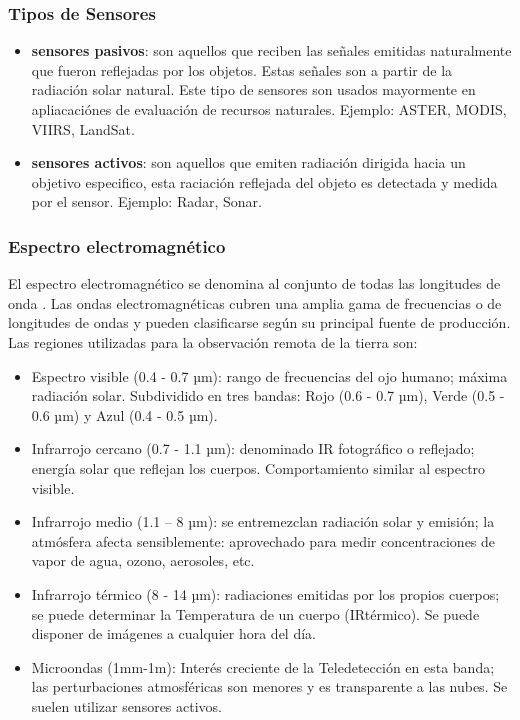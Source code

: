 \subsubsection{Tipos de Sensores}
\begin{itemize}
\item \textbf{sensores pasivos}: son aquellos que reciben las señales emitidas naturalmente que fueron reflejadas por los objetos. Estas señales son a partir de la radiación solar natural. Este tipo de sensores son  usados mayormente en apliacaciónes de evaluación de recursos naturales. Ejemplo: ASTER, MODIS, VIIRS, LandSat.

\item \textbf{sensores activos}: son aquellos que emiten radiación dirigida hacia un objetivo especifico, esta raciación reflejada del objeto es detectada y medida por el sensor. Ejemplo: Radar, Sonar.
\end{itemize}

\subsubsection{Espectro electromagnético}

El espectro electromagnético se denomina al conjunto de todas las longitudes de onda \citep{chuvieco}. Las ondas electromagnéticas cubren una amplia gama de frecuencias o de longitudes de ondas y pueden clasificarse según su principal fuente de producción. 
Las regiones utilizadas para la observación remota de la tierra son:
\begin{itemize}
\item Espectro visible (0.4 - 0.7 µm): rango de frecuencias del ojo humano; máxima radiación solar. Subdividido en tres bandas: Rojo (0.6 - 0.7 µm), Verde (0.5 - 0.6 µm) y Azul (0.4 - 0.5 µm).

\item Infrarrojo cercano (0.7 - 1.1 µm): denominado IR fotográfico o reflejado; energía solar que reflejan los cuerpos. Comportamiento similar al espectro visible.

\item Infrarrojo medio (1.1 – 8 µm): se entremezclan radiación solar y emisión; la atmósfera afecta sensiblemente: aprovechado para medir concentraciones de vapor de agua, ozono, aerosoles, etc.

\item Infrarrojo térmico (8 - 14 µm): radiaciones emitidas por los propios cuerpos; se puede determinar la Temperatura de un cuerpo (IRtérmico). Se puede disponer de imágenes a cualquier hora del día.

\item Microondas (1mm-1m): Interés creciente de la Teledetección en esta banda; las perturbaciones atmosféricas son menores y es transparente a las nubes. Se suelen utilizar sensores activos. 

\end{itemize}

